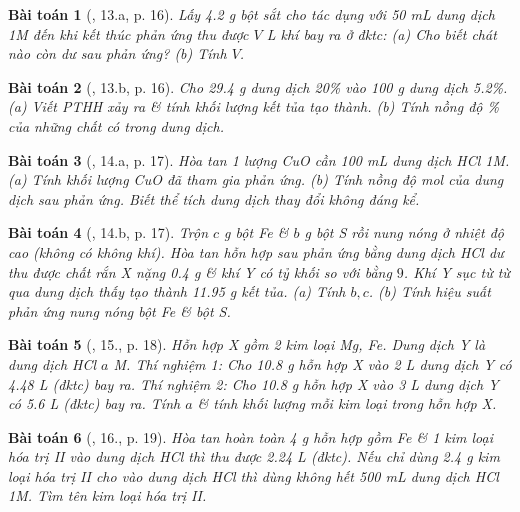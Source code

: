 \documentclass{article}
\newtheorem{baitoan}{Bài toán}
\begin{document}
\begin{baitoan}[\cite{An_350_BT_Hoa_Hoc_9}, 13.a, p. 16]
	Lấy \emph{4.2 g} bột sắt cho tác dụng với \emph{50 mL} dung dịch \emph{ 1M} đến khi kết thúc phản ứng thu được $V$ \emph{L} khí \emph{} bay ra ở đktc: (a) Cho biết chát nào còn dư sau phản ứng? (b) Tính $V$.
\end{baitoan}

\begin{baitoan}[\cite{An_350_BT_Hoa_Hoc_9}, 13.b, p. 16]
	Cho \emph{29.4 g} dung dịch \emph{ 20\%} vào \emph{100 g} dung dịch \emph{ 5.2\%}. (a) Viết PTHH xảy ra \& tính khối lượng kết tủa tạo thành. (b) Tính nồng độ \% của những chất có trong dung dịch.
\end{baitoan}

\begin{baitoan}[\cite{An_350_BT_Hoa_Hoc_9}, 14.a, p. 17]
	Hòa tan 1 lượng \emph{CuO} cần \emph{100 mL} dung dịch \emph{HCl 1M}. (a) Tính khối lượng \emph{CuO} đã tham gia phản ứng. (b) Tính nồng độ mol của dung dịch sau phản ứng. Biết thể tích dung dịch thay đổi không đáng kể.
\end{baitoan}

\begin{baitoan}[\cite{An_350_BT_Hoa_Hoc_9}, 14.b, p. 17]
	Trộn $c$ \emph{g} bột \emph{Fe} \& $b$ \emph{g} bột \emph{S} rồi nung nóng ở nhiệt độ cao (không có không khí). Hòa tan hỗn hợp sau phản ứng bằng dung dịch \emph{HCl} dư thu được chất rắn X nặng \emph{0.4 g} \& khí Y có tỷ khối so với \emph{} bằng $9$. Khí Y sục từ từ qua dung dịch \emph{} thấy tạo thành \emph{11.95 g} kết tủa. (a) Tính $b,c$. (b) Tính hiệu suất phản ứng nung nóng bột \emph{Fe} \& bột \emph{S}.
\end{baitoan}

\begin{baitoan}[\cite{An_350_BT_Hoa_Hoc_9}, 15., p. 18]
	Hỗn hợp X gồm 2 kim loại \emph{Mg, Fe}. Dung dịch Y là dung dịch \emph{HCl $a$ M}. Thí nghiệm 1: Cho \emph{10.8 g} hỗn hợp X vào \emph{2 L} dung dịch Y có \emph{4.48 L } (đktc) bay ra. Thí nghiệm 2: Cho \emph{10.8 g} hỗn hợp X vào \emph{3 L} dung dịch Y có \emph{5.6 L } (đktc) bay ra. Tính $a$ \& tính khối lượng mỗi kim loại trong hỗn hợp X.
\end{baitoan}

\begin{baitoan}[\cite{An_350_BT_Hoa_Hoc_9}, 16., p. 19]
	Hòa tan hoàn toàn \emph{4 g} hỗn hợp gồm \emph{Fe} \& 1 kim loại hóa trị II vào dung dịch \emph{HCl} thì thu được \emph{2.24 L } (đktc). Nếu chỉ dùng \emph{2.4 g} kim loại hóa trị II cho vào dung dịch \emph{HCl} thì dùng không hết \emph{500 mL} dung dịch \emph{HCl 1M}. Tìm tên kim loại hóa trị II.
\end{baitoan}
\end{document}
